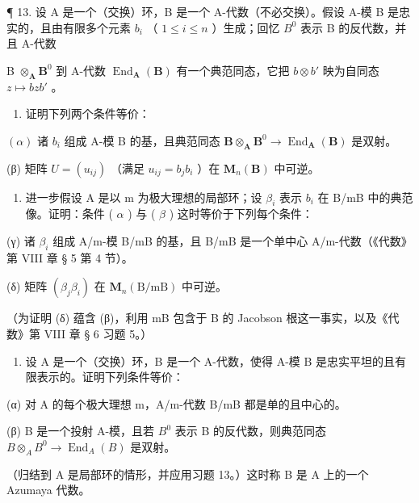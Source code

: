 ¶ 13. 设 A 是一个（交换）环，B 是一个 A-代数（不必交换）。假设 A-模 B 是忠实的，且由有限多个元素 \(b_i\) （ \(1 \leqslant i \leqslant n\) ）生成；回忆 \(B^0\) 表示 B 的反代数，并且 A-代数

B \(\otimes_{\mathbf{A}}\mathbf{B}^{0}\) 到 A-代数 \(\operatorname{End}_{\mathbf{A}}(\mathbf{B})\) 有一个典范同态，它把 \(b\otimes b'\) 映为自同态 \(z\mapsto bzb'\) 。

\begin{enumerate}
\def\labelenumi{(\alph{enumi})}
\tightlist
\item
  证明下列两个条件等价：
\end{enumerate}

\((\alpha)\) 诸 \(b_{i}\) 组成 A-模 B 的基，且典范同态 \(\mathbf{B} \otimes_{\mathbf{A}} \mathbf{B}^{0} \to \operatorname{End}_{\mathbf{A}}(\mathbf{B})\) 是双射。

(β) 矩阵 \(U = (u_{ij})\) （满足 \(u_{ij} = b_j b_i\) ）在 \(\mathbf{M}_n(\mathbf{B})\) 中可逆。

\begin{enumerate}
\def\labelenumi{(\alph{enumi})}
\setcounter{enumi}{1}
\tightlist
\item
  进一步假设 A 是以 m 为极大理想的局部环；设 \(\beta_{i}\) 表示 \(b_{i}\) 在 B/mB 中的典范像。证明：条件 ( \(\alpha\) ) 与 ( \(\beta\) ) 这时等价于下列每个条件：
\end{enumerate}

(γ) 诸 \(\beta_{i}\) 组成 A/m-模 B/mB 的基，且 B/mB 是一个单中心 A/m-代数（《代数》第 VIII 章 § 5 第 4 节）。

(δ) 矩阵 \((\beta_{j}\beta_{i})\) 在 \(\mathbf{M}_{n}(\mathrm{B}/\mathrm{mB})\) 中可逆。

（为证明 (δ) 蕴含 (β)，利用 mB 包含于 B 的 Jacobson 根这一事实，以及《代数》第 VIII 章 § 6 习题 5。）

\begin{enumerate}
\def\labelenumi{\arabic{enumi}.}
\setcounter{enumi}{13}
\tightlist
\item
  设 A 是一个（交换）环，B 是一个 A-代数，使得 A-模 B 是忠实平坦的且有限表示的。证明下列条件等价：
\end{enumerate}

(α) 对 A 的每个极大理想 m，A/m-代数 B/mB 都是单的且中心的。

(β) B 是一个投射 A-模，且若 \(B^{0}\) 表示 B 的反代数，则典范同态 \(B \otimes_{A} B^{0} \to \operatorname{End}_{A}(B)\) 是双射。

（归结到 A 是局部环的情形，并应用习题 13。）这时称 B 是 A 上的一个 Azumaya 代数。

